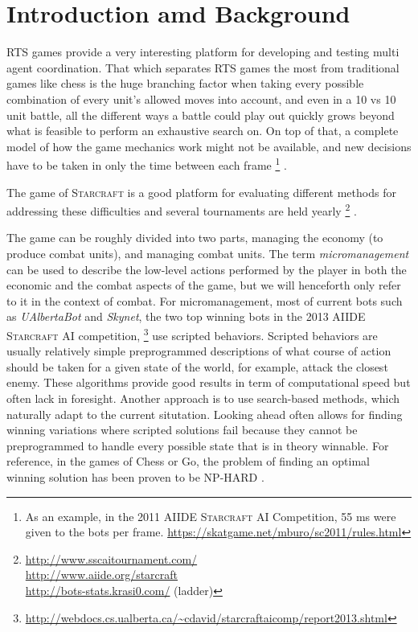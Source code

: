 \section{Introduction amd Background}
RTS games provide a very interesting platform for developing and testing multi agent coordination.
That which separates RTS games the most from traditional games like chess is the huge branching factor when taking every possible combination of every unit's allowed moves into account, and even in a 10 vs 10 unit battle, all the different ways a battle could play out quickly grows beyond what is feasible to perform an exhaustive search on.
On top of that, a complete model of how the game mechanics work might not be available, and new decisions have to be taken in only the time between each frame
\footnote{
As an example, in the 2011 AIIDE \textsc{Starcraft} AI Competition, 55 ms were given to the bots per frame.
\url{https://skatgame.net/mburo/sc2011/rules.html}
}
.

The game of \textsc{Starcraft} is a good platform for evaluating different methods for addressing these difficulties and several tournaments are held yearly
\footnote{
\url{http://www.sscaitournament.com/}\\ 
\url{http://www.aiide.org/starcraft} \\
\url{http://bots-stats.krasi0.com/} (ladder)
}
.

The game can be roughly divided into two parts, managing the economy (to produce combat units), and managing combat units.
The term \emph{micromanagement} can be used to describe the low-level actions performed by the player in both the economic and the combat aspects of the game, but we will henceforth only refer to it in the context of combat.
For micromanagement, most of current bots such as \emph{UAlbertaBot} and \emph{Skynet}, the two top winning bots in the 2013 AIIDE \textsc{Starcraft} AI competition,
\footnote{\url{http://webdocs.cs.ualberta.ca/~cdavid/starcraftaicomp/report2013.shtml}
}
use scripted behaviors.
Scripted behaviors are usually relatively simple preprogrammed descriptions of what course of action should be taken for a given state of the world, for example, attack the closest enemy.
These algorithms provide good results in term of computational speed but often lack in foresight.
Another approach is to use search-based methods, which naturally adapt to the current situtation.
Looking ahead often allows for finding winning variations where scripted solutions fail because they cannot be preprogrammed to handle every possible state that is in theory winnable.
For reference, in the games of Chess or Go, the problem of finding an optimal winning solution has been proven to be NP-HARD \cite{nphard}.


